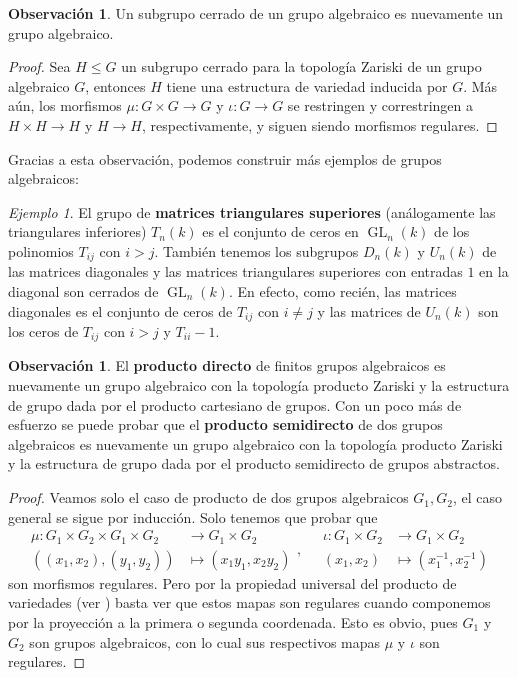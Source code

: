 \documentclass[spanish,10pt]{amsart}
\theoremstyle{definition}
\newtheorem{obs}[theorem]{Observación}
\theoremstyle{remark}
\newtheorem{example}[theorem]{Ejemplo}
\numberwithin{equation}{section}
\begin{document}
\begin{obs}\label{obs:subrupo cerrado de grupo algebraico es algebraico}
Un subgrupo cerrado de un grupo algebraico es nuevamente un grupo algebraico.
\end{obs}
\begin{proof}
Sea $H \leq G$ un subgrupo cerrado para la topología Zariski de un grupo algebraico $G$, entonces $H$ tiene una estructura de variedad inducida por $G$. Más aún, los morfismos $\mu : G \times G \to G$ y $\iota : G \to G$ se restringen y correstringen a $H \times H \to H$ y $H \to H$, respectivamente, y siguen siendo morfismos regulares.
\end{proof}

Gracias a esta observación, podemos construir más ejemplos de grupos algebraicos:
\begin{example}
El grupo de \textbf{matrices triangulares superiores} (análogamente las triangulares inferiores) $T_n (k)$ es el conjunto de ceros en $\operatorname{GL}_n (k)$ de los polinomios $T_{ij}$ con $i >j$. También tenemos los subgrupos $D_n (k)$ y $U_n (k)$ de las matrices diagonales y las matrices triangulares superiores con entradas $1$ en la diagonal son cerrados de $\operatorname{GL}_n (k)$. En efecto, como recién, las matrices diagonales es el conjunto de ceros de $T_{ij}$ con $i \neq j$ y las matrices de $U_n (k)$ son los ceros de $T_{ij}$ con $i > j$ y $T_{ii} - 1$.
\end{example}

\begin{obs}
El \textbf{producto directo} de finitos grupos algebraicos es nuevamente un grupo algebraico con la topología producto Zariski y la estructura de grupo dada por el producto cartesiano de grupos. Con un poco más de esfuerzo se puede probar que el \textbf{producto semidirecto} de dos grupos algebraicos es nuevamente un grupo algebraico con la topología producto Zariski y la estructura de grupo dada por el producto semidirecto de grupos abstractos.
\end{obs}
\begin{proof}
Veamos solo el caso de producto de dos grupos algebraicos $G_1, G_2$, el caso general se sigue por inducción. Solo tenemos que probar que
\[
    \begin{array}{ll}
    \mu : G_1 \times G_2 \times G_1 \times G_2 &\longrightarrow G_1 \times G_2 \\
    ((x_1,x_2),(y_1,y_2)) &\longmapsto (x_1 y_1, x_2 y_2)
    \end{array}, \quad
    \begin{array}{ll}
    \iota : G_1 \times G_2 &\longrightarrow G_1 \times G_2 \\
    (x_1, x_2) &\longmapsto (x_1^{-1}, x_2^{-1})
    \end{array}
\]
son morfismos regulares. Pero por la propiedad universal del producto de variedades (ver \cite[Teorema 2.6.5]{notas_pedro}) basta ver que estos mapas son regulares cuando componemos por la proyección a la primera o segunda coordenada. Esto es obvio, pues $G_1$ y $G_2$ son grupos algebraicos, con lo cual sus respectivos mapas $\mu$ y $\iota$ son regulares.
\end{proof}
\end{document}
